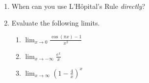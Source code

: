 \documentclass[11pt,fleqn]{article}
\def\ds{\displaystyle}
\begin{document}
\vspace*{-0.7in}

\begin{center}
  \Large{}
\end{center}
\begin{enumerate}
\item When can you use L'H\^opital's Rule \emph{directly}?
\vfill
\item Evaluate the following limits.
\begin{enumerate}
\item $\ds \lim_{x \to 0}\frac{\cos(\pi x) -1}{x^2}$
\vfill
\item $\ds \lim_{x \to -\infty} \frac{e^x}{x}$
\vfill
\item $\ds \lim_{x \to \infty} \left( 1-\frac{4}{x} \right)^x$
\vfill
\end{enumerate}
\end{enumerate}
\end{document}
